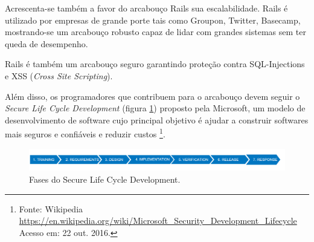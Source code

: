 \par Acrescenta-se também a favor do arcabouço Rails sua escalabilidade. Rails é utilizado por empresas de grande porte tais como Groupon, Twitter, Basecamp, mostrando-se um arcabouço robusto capaz de lidar com grandes sistemas sem ter queda de desempenho. \citep{lilia:16}
\par Rails é também um arcabouço seguro garantindo proteção contra SQL-Injections e XSS (\emph{Cross Site Scripting}).
\par Além disso, os programadores que contribuem para o arcabouço devem seguir o \emph{Secure Life Cycle Development} (figura \ref{fig:security_dev_lifecycle}) proposto pela Microsoft, um modelo de desenvolvimento de software cujo principal objetivo é ajudar a construir softwares mais seguros e confiáveis e reduzir custos \footnote{Fonte: Wikipedia \url{https://en.wikipedia.org/wiki/Microsoft_Security_Development_Lifecycle} Acesso em: 22 out. 2016.}.
\begin{figure}[htb]
\centering
\includegraphics[width=15cm]{figuras/security_dev_lifecycle}
\caption{\label{fig:security_dev_lifecycle} Fases do Secure Life Cycle Development.}
\end{figure}

